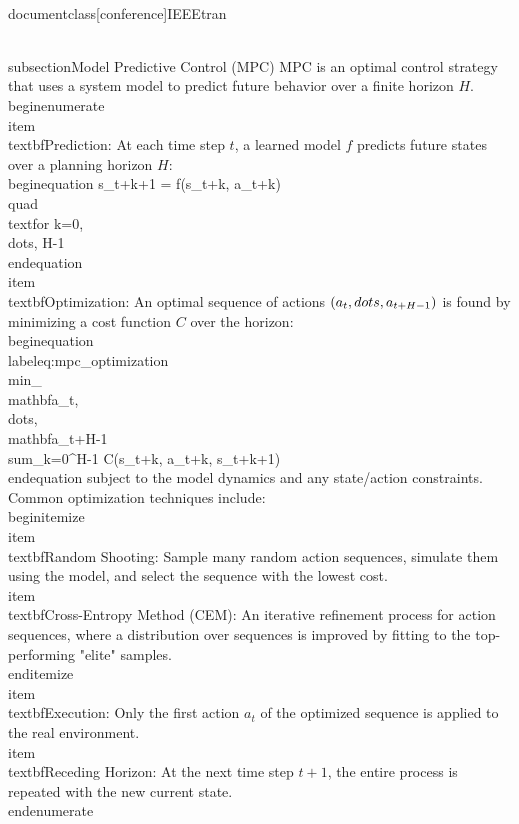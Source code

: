 \\documentclass[conference]{IEEEtran}
\begin{document}
\\subsection{Model Predictive Control (MPC)}
MPC \cite{camacho2013model} is an optimal control strategy that uses a system model to predict future behavior over a finite horizon $H$.
\\begin{enumerate}
    \\item \\textbf{Prediction}: At each time step $t$, a learned model $f$ predicts future states over a planning horizon $H$:
    \\begin{equation}
    s_{t+k+1} = f(s_{t+k}, a_{t+k}) \\quad \\text{for } k=0, \\dots, H-1
    \\end{equation}
    \\item \\textbf{Optimization}: An optimal sequence of actions $(a_t, \\dots, a_{t+H-1})$ is found by minimizing a cost function $C$ over the horizon:
    \\begin{equation}
    \\label{eq:mpc_optimization}
    \\min_{\\mathbf{a}_t, \\dots, \\mathbf{a}_{t+H-1}} \\sum_{k=0}^{H-1} C(s_{t+k}, a_{t+k}, s_{t+k+1})
    \\end{equation}
    subject to the model dynamics and any state/action constraints.
    Common optimization techniques include:
    \\begin{itemize}
        \\item \\textbf{Random Shooting}: Sample many random action sequences, simulate them using the model, and select the sequence with the lowest cost.
        \\item \\textbf{Cross-Entropy Method (CEM)}: An iterative refinement process for action sequences, where a distribution over sequences is improved by fitting to the top-performing "elite" samples.
    \\end{itemize}
    \\item \\textbf{Execution}: Only the first action $a_t$ of the optimized sequence is applied to the real environment.
    \\item \\textbf{Receding Horizon}: At the next time step $t+1$, the entire process is repeated with the new current state.
\\end{enumerate}
\end{document}
